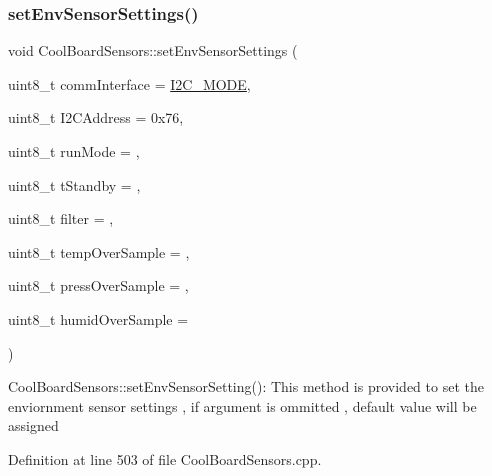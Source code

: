 \subsubsection{\texorpdfstring{set\+Env\+Sensor\+Settings()}{setEnvSensorSettings()}}
{\footnotesize\ttfamily void Cool\+Board\+Sensors\+::set\+Env\+Sensor\+Settings (\begin{DoxyParamCaption}\item[{uint8\+\_\+t}]{comm\+Interface = {\ttfamily \hyperlink{_cool_spark_fun_b_m_e280_8h_a5cd01756030509b764d43a2b8c94fce8}{I2\+C\+\_\+\+M\+O\+DE}},  }\item[{uint8\+\_\+t}]{I2\+C\+Address = {\ttfamily 0x76},  }\item[{uint8\+\_\+t}]{run\+Mode = {},  }\item[{uint8\+\_\+t}]{t\+Standby = {},  }\item[{uint8\+\_\+t}]{filter = {},  }\item[{uint8\+\_\+t}]{temp\+Over\+Sample = {},  }\item[{uint8\+\_\+t}]{press\+Over\+Sample = {},  }\item[{uint8\+\_\+t}]{humid\+Over\+Sample = {} }\end{DoxyParamCaption})}

Cool\+Board\+Sensors\+::set\+Env\+Sensor\+Setting()\+: This method is provided to set the enviornment sensor settings , if argument is ommitted , default value will be assigned 

Definition at line 503 of file Cool\+Board\+Sensors.\+cpp.


